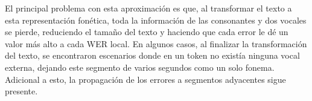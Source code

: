 El principal problema con esta aproximación es que, al transformar el texto a esta representación fonética, toda la información de las consonantes y dos vocales se pierde, reduciendo el tamaño del texto y haciendo que cada error le dé un valor más alto a cada WER local. En algunos casos, al finalizar la transformación del texto, se encontraron escenarios donde en un token no existía ninguna vocal externa, dejando este segmento de varios segundos como un solo fonema. Adicional a esto, la propagación de los errores a segmentos adyacentes sigue presente.